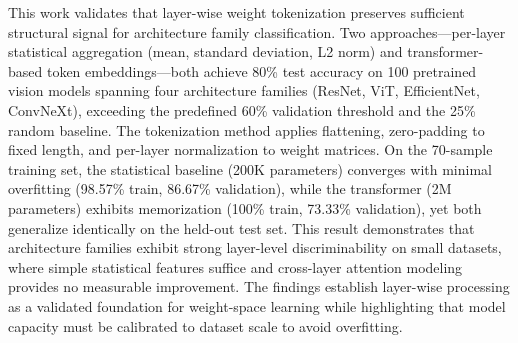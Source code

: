 
This work validates that layer-wise weight tokenization preserves sufficient structural signal for architecture family classification. Two approaches---per-layer statistical aggregation (mean, standard deviation, L2 norm) and transformer-based token embeddings---both achieve 80\% test accuracy on 100 pretrained vision models spanning four architecture families (ResNet, ViT, EfficientNet, ConvNeXt), exceeding the predefined 60\% validation threshold and the 25\% random baseline. The tokenization method applies flattening, zero-padding to fixed length, and per-layer normalization to weight matrices. On the 70-sample training set, the statistical baseline (200K parameters) converges with minimal overfitting (98.57\% train, 86.67\% validation), while the transformer (2M parameters) exhibits memorization (100\% train, 73.33\% validation), yet both generalize identically on the held-out test set. This result demonstrates that architecture families exhibit strong layer-level discriminability on small datasets, where simple statistical features suffice and cross-layer attention modeling provides no measurable improvement. The findings establish layer-wise processing as a validated foundation for weight-space learning while highlighting that model capacity must be calibrated to dataset scale to avoid overfitting.
